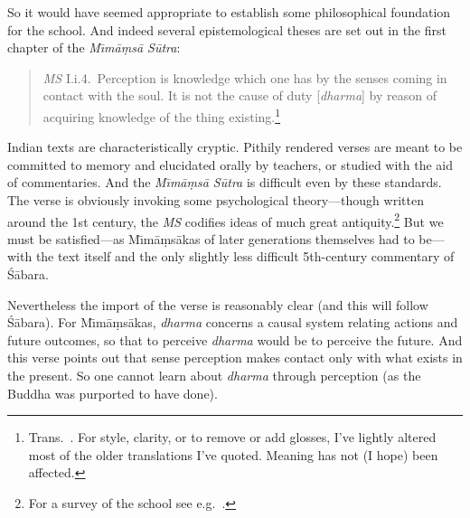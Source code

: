 \documentclass[11pt,letterpaper,oneside]{amsart}
\newcommand{\e}{\emph}
\newenvironment{squote}{\begin{quote}\sf\small}{\rm\end{quote}} %
\newcommand{\sabara}{\'S\=abara}
\begin{document}

So it would have seemed appropriate to establish some philosophical foundation for the school. And indeed several epistemological theses are set out in the first chapter of the \emph{M\={\i}m\=a\d ms\=a S\=utra}:\begin{squote}\e{MS} I.i.4.\ Perception is knowledge which one has by the senses coming in contact with the soul. It is not the cause of duty [\emph{dharma}] by reason of acquiring knowledge of the thing existing.\footnote{Trans.\ \citet{jaimini1923mimamsa}. For style, clarity, or to remove or add glosses, I've lightly altered most of the older translations I've quoted. Meaning has not (I hope) been affected.}\end{squote}Indian texts are characteristically cryptic. Pithily rendered verses are meant to be committed to memory and elucidated orally by teachers, or studied with the aid of commentaries. And the \emph{M\={\i}m\=a\d ms\=a S\=utra} is difficult even by these standards. The verse is obviously invoking some psychological theory---though written around the 1st century, the \emph{MS} codifies ideas of much great antiquity.\footnote{For a survey of the school see e.g.\ \citet{keith1921karma}.} But we must be satisfied---as M\={\i}m\=a\d ms\=akas of later generations themselves had to be---with the text itself and the only slightly less difficult 5th-century commentary of \sabara.

Nevertheless the import of the verse is reasonably clear (and this will follow \sabara). For M\={\i}m\=a\d ms\=akas, \emph{dharma} concerns a causal system relating actions and future outcomes, so that to perceive \emph{dharma} would be to perceive the future. And this verse points out that sense perception makes contact only with what exists in the present. So one cannot learn about \emph{dharma} through perception (as the Buddha was purported to have done).
\end{document}
